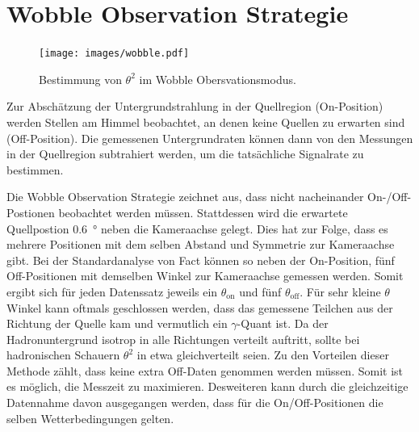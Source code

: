 \section{Wobble Observation Strategie}
\begin{figure}
  \texttt{[image: images/wobble.pdf]}
  \caption{Bestimmung von $\theta^{2}$ im Wobble Obersvationsmodus.}
\end{figure}
Zur Abschätzung der Untergrundstrahlung in der Quellregion (On-Position) werden Stellen am Himmel beobachtet, an denen keine Quellen zu erwarten sind (Off-Position).
Die gemessenen Untergrundraten können dann von den Messungen in der Quellregion subtrahiert werden, um die tatsächliche Signalrate zu bestimmen.

Die Wobble Observation Strategie zeichnet aus, dass nicht nacheinander On-/Off-Postionen beobachtet werden müssen. 
Stattdessen wird die erwartete Quellpostion \SI{0.6}{\degree} neben die Kameraachse gelegt. 
Dies hat zur Folge, dass es mehrere Positionen mit dem selben Abstand und Symmetrie zur Kameraachse gibt. 
Bei der Standardanalyse von Fact können so neben der On-Position, fünf Off-Positionen mit demselben Winkel zur Kameraachse gemessen werden. 
Somit ergibt sich für jeden Datenssatz jeweils ein $\theta_\text{on}$ und fünf $\theta_\text{off}$. 
Für sehr kleine $\theta$ Winkel kann oftmals geschlossen werden, dass das gemessene Teilchen aus der Richtung der Quelle kam und vermutlich ein $\gamma$-Quant ist. 
Da der Hadronuntergrund isotrop in alle Richtungen verteilt auftritt, sollte bei hadronischen Schauern $\theta^{2}$ in etwa gleichverteilt seien. 
Zu den Vorteilen dieser Methode zählt, dass keine extra Off-Daten genommen werden müssen. 
Somit ist es möglich, die Messzeit zu maximieren. 
Desweiteren kann durch die gleichzeitige Datennahme davon ausgegangen werden, dass für die On/Off-Positionen die selben Wetterbedingungen gelten. 

